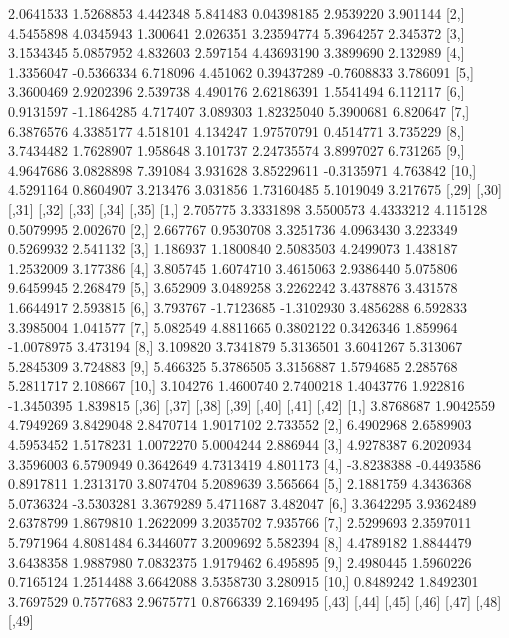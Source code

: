 \documentclass[12pt]{article}
\begin{document}
\begin{Schunk}
\begin{Soutput}
          [,22]      [,23]    [,24]    [,25]      [,26]      [,27]    [,28]
 [1,] 2.0641533  1.5268853 4.442348 5.841483 0.04398185  2.9539220 3.901144
 [2,] 4.5455898  4.0345943 1.300641 2.026351 3.23594774  5.3964257 2.345372
 [3,] 3.1534345  5.0857952 4.832603 2.597154 4.43693190  3.3899690 2.132989
 [4,] 1.3356047 -0.5366334 6.718096 4.451062 0.39437289 -0.7608833 3.786091
 [5,] 3.3600469  2.9202396 2.539738 4.490176 2.62186391  1.5541494 6.112117
 [6,] 0.9131597 -1.1864285 4.717407 3.089303 1.82325040  5.3900681 6.820647
 [7,] 6.3876576  4.3385177 4.518101 4.134247 1.97570791  0.4514771 3.735229
 [8,] 3.7434482  1.7628907 1.958648 3.101737 2.24735574  3.8997027 6.731265
 [9,] 4.9647686  3.0828898 7.391084 3.931628 3.85229611 -0.3135971 4.763842
[10,] 4.5291164  0.8604907 3.213476 3.031856 1.73160485  5.1019049 3.217675
         [,29]      [,30]      [,31]     [,32]    [,33]      [,34]    [,35]
 [1,] 2.705775  3.3331898  3.5500573 4.4333212 4.115128  0.5079995 2.002670
 [2,] 2.667767  0.9530708  3.3251736 4.0963430 3.223349  0.5269932 2.541132
 [3,] 1.186937  1.1800840  2.5083503 4.2499073 1.438187  1.2532009 3.177386
 [4,] 3.805745  1.6074710  3.4615063 2.9386440 5.075806  9.6459945 2.268479
 [5,] 3.652909  3.0489258  3.2262242 3.4378876 3.431578  1.6644917 2.593815
 [6,] 3.793767 -1.7123685 -1.3102930 3.4856288 6.592833  3.3985004 1.041577
 [7,] 5.082549  4.8811665  0.3802122 0.3426346 1.859964 -1.0078975 3.473194
 [8,] 3.109820  3.7341879  5.3136501 3.6041267 5.313067  5.2845309 3.724883
 [9,] 5.466325  5.3786505  3.3156887 1.5794685 2.285768  5.2811717 2.108667
[10,] 3.104276  1.4600740  2.7400218 1.4043776 1.922816 -1.3450395 1.839815
           [,36]      [,37]     [,38]      [,39]     [,40]     [,41]    [,42]
 [1,]  3.8768687  1.9042559 4.7949269  3.8429048 2.8470714 1.9017102 2.733552
 [2,]  6.4902968  2.6589903 4.5953452  1.5178231 1.0072270 5.0004244 2.886944
 [3,]  4.9278387  6.2020934 3.3596003  6.5790949 0.3642649 4.7313419 4.801173
 [4,] -3.8238388 -0.4493586 0.8917811  1.2313170 3.8074704 5.2089639 3.565664
 [5,]  2.1881759  4.3436368 5.0736324 -3.5303281 3.3679289 5.4711687 3.482047
 [6,]  3.3642295  3.9362489 2.6378799  1.8679810 1.2622099 3.2035702 7.935766
 [7,]  2.5299693  2.3597011 5.7971964  4.8081484 6.3446077 3.2009692 5.582394
 [8,]  4.4789182  1.8844479 3.6438358  1.9887980 7.0832375 1.9179462 6.495895
 [9,]  2.4980445  1.5960226 0.7165124  1.2514488 3.6642088 3.5358730 3.280915
[10,]  0.8489242  1.8492301 3.7697529  0.7577683 2.9675771 0.8766339 2.169495
           [,43]     [,44]    [,45]     [,46]     [,47]     [,48]      [,49]

\end{Soutput}
\end{Schunk}
\end{document}
